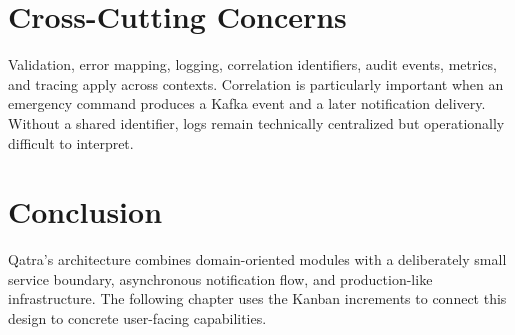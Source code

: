 \section{Cross-Cutting Concerns}
Validation, error mapping, logging, correlation identifiers, audit events, metrics, and tracing apply across contexts. Correlation is particularly important when an emergency command produces a Kafka event and a later notification delivery. Without a shared identifier, logs remain technically centralized but operationally difficult to interpret.

\section*{Conclusion}
Qatra's architecture combines domain-oriented modules with a deliberately small service boundary, asynchronous notification flow, and production-like infrastructure. The following chapter uses the Kanban increments to connect this design to concrete user-facing capabilities.
